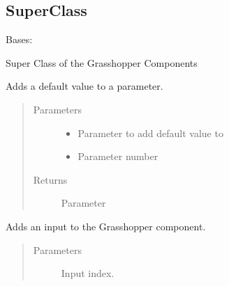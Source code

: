 \documentclass[letterpaper,10pt,english]{sphinxmanual}
\begin{document}
\subsection{SuperClass}
\label{\detokenize{superclass:superclass}}\label{\detokenize{superclass:module-livestock.components.component}}\label{\detokenize{superclass::doc}}

\begin{fulllineitems}
\label{\detokenize{superclass:livestock.components.component.GHComponent}}
Bases: 

Super Class of the Grasshopper Components

\begin{fulllineitems}
\label{\detokenize{superclass:livestock.components.component.GHComponent.add_default_value}}
Adds a default value to a parameter.
\begin{quote}\begin{description}
\item[{Parameters}] \leavevmode\begin{itemize}
\item {} 
 \textendash{} Parameter to add default value to

\item {} 
 \textendash{} Parameter number

\end{itemize}

\item[{Returns}] \leavevmode
Parameter

\end{description}\end{quote}

\end{fulllineitems}


\begin{fulllineitems}
\label{\detokenize{superclass:livestock.components.component.GHComponent.add_input_parameter}}
Adds an input to the Grasshopper component.
\begin{quote}\begin{description}
\item[{Parameters}] \leavevmode
{} \textendash{} Input index.


\end{description}
\end{quote}
\end{fulllineitems}
\end{fulllineitems}
\end{document}
